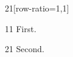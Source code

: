 \documentclass[paper=A4]{ropas-poster}
\begin{document}
\begin{postergrid}{2}{1}[row-ratio={1,1}]
\begin{posterblock}{1}{1}
First.
\end{posterblock}
\begin{posterblock}{2}{1}
Second.
\end{posterblock}
\end{postergrid}
\end{document}
